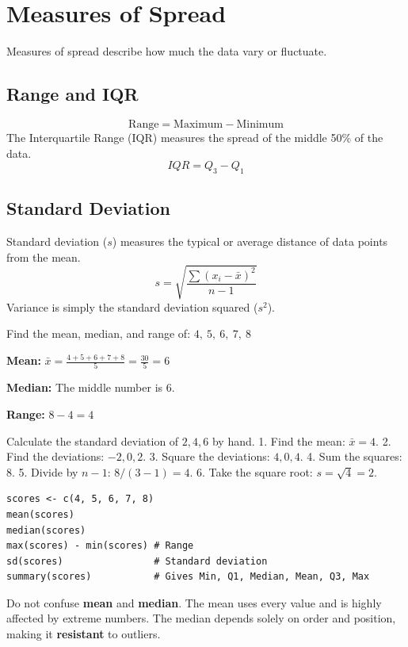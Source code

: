 \documentclass[11pt,openany]{book}
\begin{document}
\section{Measures of Spread}
Measures of spread describe how much the data vary or fluctuate.

\subsection{Range and IQR}
\[
\text{Range} = \text{Maximum} - \text{Minimum}
\]
The Interquartile Range (IQR) measures the spread of the middle 50\% of the data.
\[
IQR = Q_3 - Q_1
\]

\subsection{Standard Deviation}
Standard deviation ($s$) measures the typical or average distance of data points from the mean.
\[
s = \sqrt{ \frac{\sum (x_i - \bar{x})^2}{n - 1} }
\]
Variance is simply the standard deviation squared ($s^2$).

\begin{examplebox}
Find the mean, median, and range of: $4,\ 5,\ 6,\ 7,\ 8$

\textbf{Mean:} $\bar{x} = \frac{4+5+6+7+8}{5} = \frac{30}{5} = 6$

\textbf{Median:} The middle number is $6$.

\textbf{Range:} $8 - 4 = 4$
\end{examplebox}

\begin{byhand}
Calculate the standard deviation of $2, 4, 6$ by hand.
1. Find the mean: $\bar{x} = 4$.
2. Find the deviations: $-2, 0, 2$.
3. Square the deviations: $4, 0, 4$.
4. Sum the squares: $8$.
5. Divide by $n-1$: $8 / (3-1) = 4$.
6. Take the square root: $s = \sqrt{4} = 2$.
\end{byhand}

\begin{rstudio}
\begin{lstlisting}[style=rcode]
scores <- c(4, 5, 6, 7, 8)
mean(scores)
median(scores)
max(scores) - min(scores) # Range
sd(scores)                # Standard deviation
summary(scores)           # Gives Min, Q1, Median, Mean, Q3, Max
\end{lstlisting}
\end{rstudio}

\begin{mistakealert}
Do not confuse \textbf{mean} and \textbf{median}. The mean uses every value and is highly affected by extreme numbers. The median depends solely on order and position, making it \textbf{resistant} to outliers.
\end{mistakealert}
\end{document}
